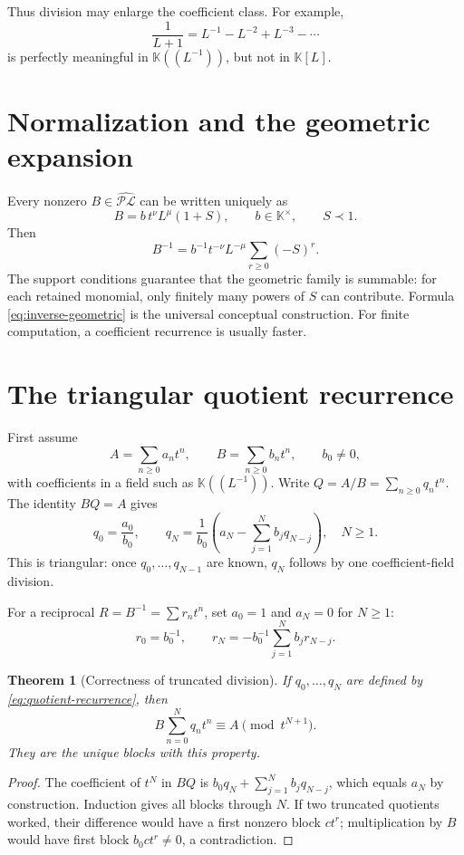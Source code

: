 \documentclass[11pt,oneside]{book}
\newtheorem{theorem}{Theorem}[chapter]
\theoremstyle{definition}
\theoremstyle{remark}
\newcommand{\K}{\mathbb K}
\newcommand{\PLfield}{\widehat{\mathscr{PL}}}
\newcommand{\precdom}{\prec}
\begin{document}
Thus division may enlarge the coefficient class.  For example,
\[
 \frac1{L+1}=L^{-1}-L^{-2}+L^{-3}-\cdots
\]
is perfectly meaningful in $\K((L^{-1}))$, but not in $\K[L]$.

\section{Normalization and the geometric expansion}
Every nonzero $B\in\PLfield$ can be written uniquely as
\begin{equation}\label{eq:division-normalization}
 B=b\,t^\nu L^\mu(1+S),
 \qquad b\in\K^\times,
 \qquad S\precdom1.
\end{equation}
Then
\begin{equation}\label{eq:inverse-geometric}
 B^{-1}=b^{-1}t^{-\nu}L^{-\mu}
 \sum_{r\ge0}(-S)^r.
\end{equation}
The support conditions guarantee that the geometric family is summable: for
each retained monomial, only finitely many powers of $S$ can contribute.
Formula \eqref{eq:inverse-geometric} is the universal conceptual construction.
For finite computation, a coefficient recurrence is usually faster.

\section{The triangular quotient recurrence}
First assume
\begin{equation}\label{eq:quotient-normalized}
 A=\sum_{n\ge0}a_n t^n,
 \qquad
 B=\sum_{n\ge0}b_n t^n,
 \qquad b_0\ne0,
\end{equation}
with coefficients in a field such as $\K((L^{-1}))$.  Write
$Q=A/B=\sum_{n\ge0}q_nt^n$.  The identity $BQ=A$ gives
\begin{equation}\label{eq:quotient-recurrence}
 q_0=\frac{a_0}{b_0},
 \qquad
 q_N=\frac{1}{b_0}
 \left(a_N-\sum_{j=1}^{N}b_jq_{N-j}\right),
 \quad N\ge1.
\end{equation}
This is triangular: once $q_0,\ldots,q_{N-1}$ are known, $q_N$ follows by one
coefficient-field division.

For a reciprocal $R=B^{-1}=\sum r_nt^n$, set $a_0=1$ and $a_N=0$ for
$N\ge1$:
\begin{equation}\label{eq:reciprocal-recurrence}
 r_0=b_0^{-1},
 \qquad
 r_N=-b_0^{-1}\sum_{j=1}^{N}b_jr_{N-j}.
\end{equation}

\begin{theorem}[Correctness of truncated division]\label{thm:division-correct}
If $q_0,\ldots,q_N$ are defined by \eqref{eq:quotient-recurrence}, then
\[
 B\sum_{n=0}^{N}q_nt^n
 \equiv A\pmod{t^{N+1}}.
\]
They are the unique blocks with this property.
\end{theorem}
\begin{proof}
The coefficient of $t^N$ in $BQ$ is
$b_0q_N+\sum_{j=1}^Nb_jq_{N-j}$, which equals $a_N$ by construction.
Induction gives all blocks through $N$.  If two truncated quotients worked,
their difference would have a first nonzero block $ct^r$; multiplication by
$B$ would have first block $b_0ct^r\ne0$, a contradiction.
\end{proof}
\end{document}
